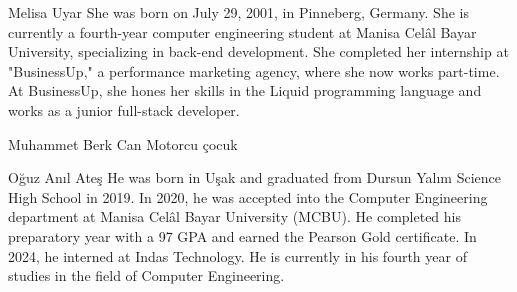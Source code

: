 \documentclass[a4paper,journal]{IEEEtran}
\begin{document}
\begin{IEEEbiography}{Melisa Uyar}
She was born on July 29, 2001, in Pinneberg, Germany.
She is currently a fourth-year computer engineering student at Manisa Celâl
Bayar University, specializing in back-end development.
She completed her internship at "BusinessUp," a performance marketing agency,
where she now works part-time.
At BusinessUp, she hones her skills in the Liquid programming language and
works as a junior full-stack developer.
\end{IEEEbiography}

\begin{IEEEbiography}{Muhammet Berk Can}
Motorcu çocuk
\end{IEEEbiography}

\begin{IEEEbiography}{Oğuz Anıl Ateş}
He was born in Uşak and graduated from Dursun Yalım Science High School in 2019.
In 2020, he was accepted into the Computer Engineering department at Manisa
Celâl Bayar University (MCBU).
He completed his preparatory year with a 97 GPA and earned the Pearson Gold
certificate.
In 2024, he interned at Indas Technology.
He is currently in his fourth year of studies in the field of Computer
Engineering.
\end{IEEEbiography}
\end{document}
